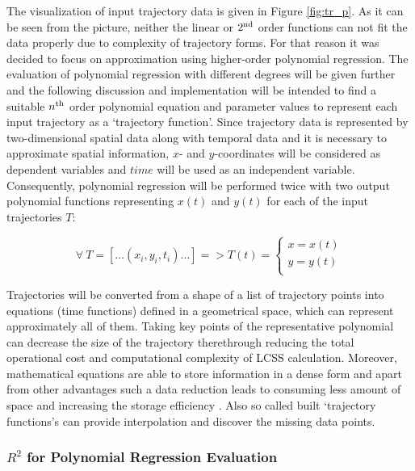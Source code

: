 The visualization of input trajectory data is given in Figure \ref{fig:tr_p}. As it can be seen from the picture, neither the linear or $2\textsuperscript{nd}$ order functions can not fit the data properly due to complexity of trajectory forms. For that reason it was decided to focus on approximation using higher-order polynomial regression. The evaluation of polynomial regression with different degrees will be given further and the following discussion and implementation will be intended to find a suitable $n\textsuperscript{th}$ order polynomial equation and parameter values to represent each input trajectory as a `trajectory function'. Since trajectory data is represented by two-dimensional spatial data along with temporal data and it is necessary to approximate spatial information, $x$- and $y$-coordinates will be considered as dependent variables and $time$ will be used as an independent variable. Consequently, polynomial regression will be performed twice with two output polynomial functions representing $x(t)$ and $y(t)$ for each of the input trajectories $T$:

\begin{equation}\label{eq:regr-func}
	\forall\ T = [\ldots (x_i, y_i, t_i) \ldots] = > T(t) = 
		\begin{cases}
			x = x(t) \\
			y = y(t) \\
		\end{cases}
\end{equation}

Trajectories will be converted from a shape of a list of trajectory points into equations (time functions) defined in a geometrical space, which can represent approximately all of them. Taking key points of the representative polynomial can decrease the size of the trajectory therethrough reducing the total operational cost and computational complexity of LCSS calculation. Moreover, mathematical equations are able to store information in a dense form and apart from other advantages such a data reduction leads to consuming less amount of space and increasing the storage efficiency \cite{article:behav_form_extr}. Also so called built `trajectory functions's can provide interpolation and discover the missing data points.

\bigbreak

\subsubsection{$R^2$ for Polynomial Regression Evaluation}

